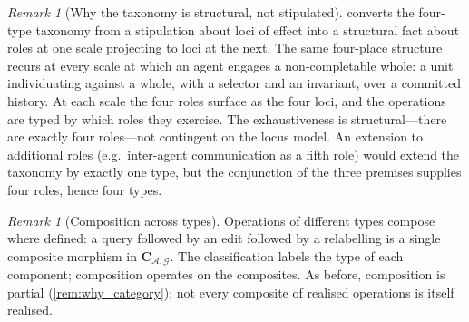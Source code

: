 \documentclass[11pt,twocolumn,a4paper]{article}
\theoremstyle{thmstyle}
\theoremstyle{definition}
\theoremstyle{remark}
\newtheorem{remark}[theorem]{Remark}
\newcommand{\Graph}{\mathcal{G}}
\newcommand{\Agent}{\mathcal{A}}
\begin{document}
\begin{remark}[Why the taxonomy is structural, not stipulated]
\label{rem:taxonomy_honest}
 converts the four-type taxonomy from
a stipulation about loci of effect into a structural fact about
roles at one scale projecting to loci at the next. The same
four-place structure recurs at every scale at which an agent
engages a non-completable whole: a unit individuating against a
whole, with a selector and an invariant, over a committed history.
At each scale the four roles surface as the four loci, and the
operations are typed by which roles they exercise. The
exhaustiveness is structural---there are exactly four roles---not
contingent on the locus model. An extension to additional roles
(e.g.\ inter-agent communication as a fifth role) would extend the
taxonomy by exactly one type, but the conjunction of the three
premises supplies four roles, hence four types.
\end{remark}

\begin{remark}[Composition across types]
\label{rem:cross_type}
Operations of different types compose where defined: a query
followed by an edit followed by a relabelling is a single
composite morphism in $\mathbf{C}_{\Agent,\Graph}$. The
classification labels the type of each component; composition
operates on the composites. As before, composition is partial
(\cref{rem:why_category}); not every composite of realised
operations is itself realised.
\end{remark}
\end{document}
